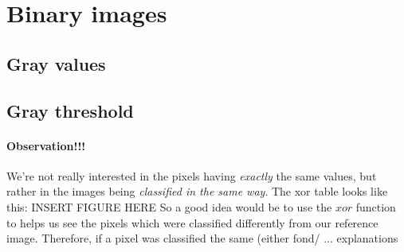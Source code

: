 \section{Binary images}

\subsection{Gray values}

\paragraph{}
\subsection{Gray threshold}
\paragraph{Observation!!!}
We're not really interested in the pixels having \emph{exactly} the same values, but rather in the images being \emph{classified in the same way}.
The xor table looks like this:
INSERT FIGURE HERE
So a good idea would be to use the $xor$ function to helps us see the pixels which were classified differently from our reference image.
Therefore, if a pixel was classified the same (either fond/
... explanations 